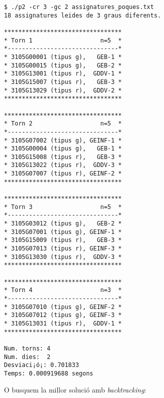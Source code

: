 \documentclass[10pt,a4paper]{../documents/class_material_assignatura_udg}
\begin{document}
\begin{lstlisting}[style=codibash]
$ ./p2 -cr 3 -gc 2 assignatures_poques.txt
18 assignatures leides de 3 graus diferents.

*********************************
* Torn 1                   n=5  *
*-------------------------------*
* 3105G00001 (tipus g),   GEB-1 *
* 3105G00015 (tipus g),   GEB-2 *
* 3105G13001 (tipus r),  GDDV-1 *
* 3105G15007 (tipus r),   GEB-3 *
* 3105G13029 (tipus r),  GDDV-2 *
*********************************

*********************************
* Torn 2                   n=5  *
*-------------------------------*
* 3105G07002 (tipus g), GEINF-1 *
* 3105G00004 (tipus g),   GEB-1 *
* 3105G15008 (tipus r),   GEB-3 *
* 3105G13022 (tipus r),  GDDV-3 *
* 3105G07007 (tipus r), GEINF-2 *
*********************************

*********************************
* Torn 3                   n=5  *
*-------------------------------*
* 3105G03012 (tipus g),   GEB-2 *
* 3105G07001 (tipus g), GEINF-1 *
* 3105G15009 (tipus r),   GEB-3 *
* 3105G07013 (tipus r), GEINF-3 *
* 3105G13030 (tipus r),  GDDV-3 *
*********************************

*********************************
* Torn 4                   n=3  *
*-------------------------------*
* 3105G07010 (tipus g), GEINF-2 *
* 3105G07012 (tipus g), GEINF-3 *
* 3105G13031 (tipus r),  GDDV-1 *
*********************************

Num. torns: 4
Num. dies:  2
Desviaci¡ó¡: 0.701833
Temps: 0.000919688 segons
\end{lstlisting}

O busquem la millor solució amb \textit{backtracking}:
\end{document}
